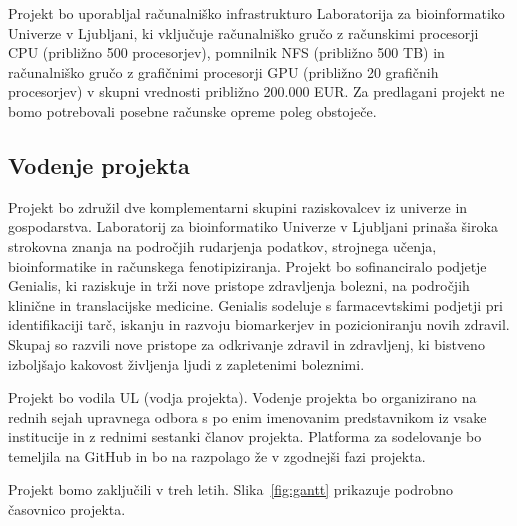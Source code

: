 \documentclass[11pt,a4paper]{article}
\begin{document}
Projekt bo uporabljal računalniško infrastrukturo Laboratorija za bioinformatiko Univerze v Ljubljani, ki vključuje računalniško gručo z računskimi procesorji CPU (približno 500 procesorjev), pomnilnik NFS (približno 500 TB) in računalniško gručo z grafičnimi procesorji GPU (približno 20 grafičnih procesorjev) v skupni vrednosti približno 200.000 EUR. Za predlagani projekt ne bomo potrebovali posebne računske opreme poleg obstoječe.

\subsection{Vodenje projekta}

Projekt bo združil dve komplementarni skupini raziskovalcev iz univerze in gospodarstva. Laboratorij za bioinformatiko Univerze v Ljubljani prinaša široka strokovna znanja na področjih rudarjenja podatkov, strojnega učenja, bioinformatike in računskega fenotipiziranja. Projekt bo sofinanciralo podjetje Genialis, ki raziskuje in trži nove pristope zdravljenja bolezni, na področjih klinične in translacijske medicine. Genialis sodeluje s farmacevtskimi podjetji pri identifikaciji tarč, iskanju in razvoju biomarkerjev in pozicioniranju novih zdravil. Skupaj so razvili nove pristope za odkrivanje zdravil in zdravljenj, ki bistveno izboljšajo kakovost življenja ljudi z zapletenimi boleznimi.

Projekt bo vodila UL (vodja projekta). Vodenje projekta bo organizirano na rednih sejah upravnega odbora s po enim imenovanim predstavnikom iz vsake institucije in z rednimi sestanki članov projekta. Platforma za sodelovanje bo temeljila na GitHub in bo na razpolago že v zgodnejši fazi projekta.

Projekt bomo zaključili v treh letih. Slika~\ref{fig:gantt} prikazuje podrobno časovnico projekta.
\end{document}
